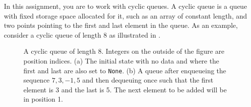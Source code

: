 In this assignment, you are to work with cyclic queues. A cyclic queue is a queue with fixed storage space allocated for it, such as an array of constant length, and two points pointing to the first and last element in the queue. As an example, consider a cyclic queue of length 8 as illustrated in .
\begin{figure}
  \caption{A cyclic queue of length 8. Integers on the outside of the figure are position indices. (a) The initial state with no data and where the first and last are also set to \lstinline{None}. (b) A queue after enqueueing the sequence $7, 3, -1, 5$ and then dequeuing once such that the first element is 3 and the last is 5. The next element to be added will be in position 1.}
\end{figure}
